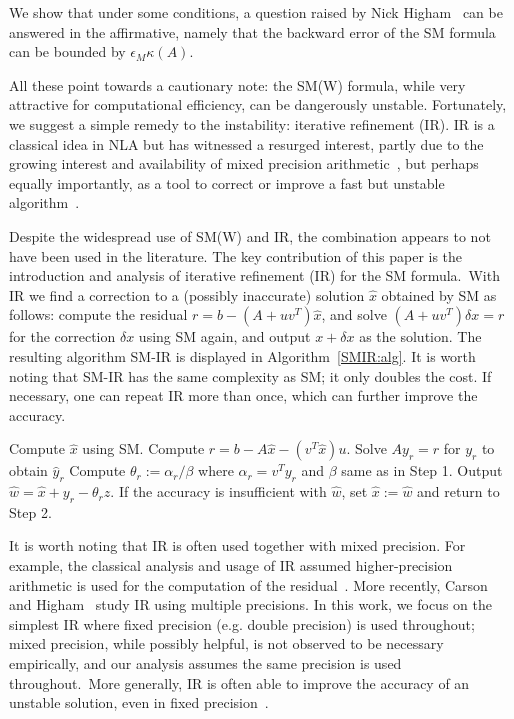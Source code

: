 \documentclass{siamltex}
\newcommand{\eps}{\epsilon}
\begin{document}
We show that under some conditions, a question raised by Nick Higham~\cite[p.~570]{Higham02} can be answered in the affirmative, namely that the backward error of the SM formula can be bounded by $\eps_M \kappa(A)$.

All these point towards a cautionary note: the SM(W) formula, while very attractive for computational efficiency, can be dangerously unstable. 
Fortunately, we suggest a simple remedy to the instability: iterative refinement (IR). 
IR is a classical idea in NLA but has witnessed a resurged interest, partly due to the growing interest and availability of mixed precision arithmetic~\cite{carson2018accelerating}, but perhaps equally importantly, as a tool to correct or improve a fast but unstable algorithm~\cite{epperly2024fast}.

Despite the widespread use of SM(W) and IR, the combination appears to not have been used in the literature. The key contribution of this paper is the introduction and analysis of iterative refinement (IR) for the SM formula.\ With IR we find a correction to a (possibly inaccurate) solution $\hat x$ obtained by SM as follows: compute the residual $r=b-(A+uv^T)\hat x$, and solve $(A+uv^T)\delta x = r$ for the correction $\delta x$ using SM again, and output $x+\delta x$ as the solution. 
The resulting algorithm SM-IR is displayed in Algorithm~\ref{SMIR:alg}. 
It is worth noting that SM-IR has the same complexity as SM; it only doubles the cost. 
If necessary, one can repeat IR more than once, which can further improve the accuracy. 

\begin{algorithm}[!h]
\caption{SM-IR: Sherman-Morrison formula with iterative refinement for solving $(A+uv^T)x = b$.}
\label{SMIR:alg}
\begin{algorithmic}[1]
\STATE Compute $\hat x$ using SM.
\STATE Compute $r  = b - A \hat x - (v^T \hat x) u$.
\STATE Solve $A y_r = r$ for $y_r$ to obtain $\hat y_r$
\STATE Compute $\theta_r := \alpha_r / \beta$ where $\alpha_r = v^T y_r$ and $\beta$ same as in Step 1.
\STATE Output $\hat w = \hat x + y_r - \theta_r z$.
\STATE If the accuracy is insufficient with $\hat w$, set $\hat x:=\hat w$ and return to Step 2.
\end{algorithmic}
\end{algorithm}

It is worth noting that IR is often used together with mixed precision. For example, the classical analysis and usage of IR assumed higher-precision arithmetic is used for the computation of the residual~\cite[Ch.~12]{Higham02}. More recently, Carson and Higham~\cite{carson2018accelerating} study IR using multiple precisions. 
In this work, we focus on the simplest IR where fixed precision (e.g. double precision) is used throughout; mixed precision, while possibly helpful, is not observed to be necessary empirically, and our analysis assumes the same precision is used throughout.\ More generally, IR is often able to improve the accuracy of an unstable solution, even in fixed precision~\cite{jankowski1977iterative,skeel1980iterative}. 
\end{document}
